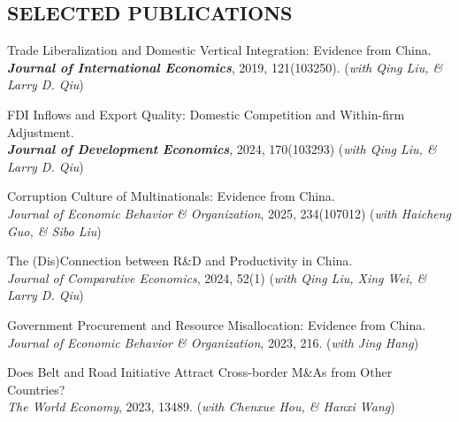 \documentclass{res}
\begin{document}
\begin{resume}
 
 
 
 
\section{SELECTED PUBLICATIONS}  
 \vspace{0.8em}
        
 Trade Liberalization and Domestic Vertical Integration: Evidence from China.\\  {\bf \em Journal of International Economics}, 2019, 121(103250). ({\em with Qing Liu, \& Larry D. Qiu})  \\

 \vspace{-1.6em}

 FDI Inflows and Export Quality: Domestic Competition and Within-firm Adjustment. \\  {\bf \em Journal of Development Economics}, 2024, 170(103293) ({\em with Qing Liu,  \& Larry D. Qiu})  \\

 \vspace{-1.6em}
 
 Corruption Culture of Multinationals: Evidence from China. \\
{\em Journal of Economic Behavior \& Organization}, 2025, 234(107012) ({\em with Haicheng Guo,  \& Sibo Liu}) \\
 \vspace{-1.6em} 
 
The (Dis)Connection between R\&D and Productivity in China. \\   {\em Journal of Comparative Economics}, 2024, 52(1)  ({\em with Qing Liu, Xing Wei,  \& Larry D. Qiu}) \\

 \vspace{-1.6em}
 

  
  
 Government Procurement and Resource Misallocation: Evidence from China. \\
\textit{Journal of Economic Behavior \& Organization}, 2023, 216.  ({\em with Jing Hang})\\
 
  \vspace{-1.6em}
   
 Does Belt and Road Initiative Attract Cross-border M\&As from Other Countries? \\
  \textit{The World Economy}, 2023, 13489. ({\em with Chenxue Hou,  \& Hanxi Wang}) \\
 

\end{resume}
\end{document}
